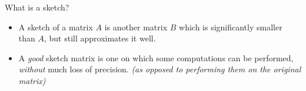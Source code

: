 \documentclass[first=dgreen,second=purple,logo=redque]{aaltoslides}
\begin{document}





\begin{frame}{What is a sketch?}
\begin{itemize}
  \item A sketch of a matrix $A$ is another matrix $B$ which is significantly
  smaller than $A$, but still approximates it well.
  \item A \textit{good} sketch matrix is one on which some computations can
  be performed, \textit{without} much loss of precision.
   \emph{(as opposed to performing them on the original matrix)}
\end{itemize}
\end{frame}

\end{document}
